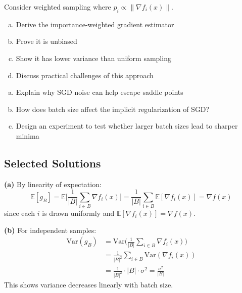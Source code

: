 \documentclass[../main.tex]{subfiles}
\begin{document}
\begin{simpleexercise}
Consider weighted sampling where $p_i \propto \|\nabla f_i(x)\|$.
\begin{enumerate}[(a)]
    \item Derive the importance-weighted gradient estimator
    \item Prove it is unbiased
    \item Show it has lower variance than uniform sampling
    \item Discuss practical challenges of this approach
\end{enumerate}
\end{simpleexercise}

\begin{simpleexercise}
\begin{enumerate}[(a)]
    \item Explain why SGD noise can help escape saddle points
    \item How does batch size affect the implicit regularization of SGD?
    \item Design an experiment to test whether larger batch sizes lead to sharper minima
\end{enumerate}
\end{simpleexercise}

\subsection{Selected Solutions}

\begin{solution}[Exercise 2.2(a,b)]
\textbf{(a)} By linearity of expectation:
\[
\mathbb{E}[g_B] = \mathbb{E}\Big[\frac{1}{|B|}\sum_{i \in B} \nabla f_i(x)\Big] = \frac{1}{|B|}\sum_{i \in B} \mathbb{E}[\nabla f_i(x)] = \nabla f(x)
\]
since each $i$ is drawn uniformly and $\mathbb{E}[\nabla f_i(x)] = \nabla f(x)$.

\textbf{(b)} For independent samples:
\begin{align}
\text{Var}(g_B) &= \text{Var}\Big(\frac{1}{|B|}\sum_{i \in B} \nabla f_i(x)\Big) \\
&= \frac{1}{|B|^2} \sum_{i \in B} \text{Var}(\nabla f_i(x)) \\
&= \frac{1}{|B|^2} \cdot |B| \cdot \sigma^2 = \frac{\sigma^2}{|B|}
\end{align}
This shows variance decreases linearly with batch size.
\end{solution}
\end{document}
